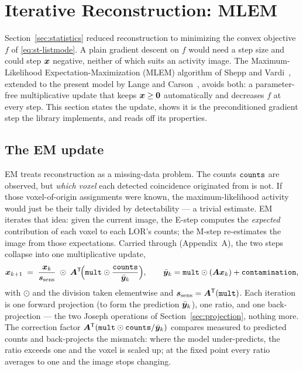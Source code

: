 \section{Iterative Reconstruction: MLEM}
\label{sec:mlem}

Section~\ref{sec:statistics} reduced reconstruction to minimizing the convex
objective $f$ of \eqref{eq:st-listmode}. A plain gradient descent on $f$ would
need a step size and could step $\bm{x}$ negative, neither of which suits an
activity image. The Maximum-Likelihood Expectation-Maximization (MLEM) algorithm
of Shepp and Vardi~\cite{shepp1982}, extended to the present model by Lange and
Carson~\cite{lange1984}, avoids both: a parameter-free multiplicative update that
keeps $\bm{x}\ge\bm0$ automatically and decreases $f$ at every step. This section
states the update, shows it is the preconditioned gradient step the library
implements, and reads off its properties.

\subsection{The EM update}
\label{sec:mlem:em}

EM treats reconstruction as a missing-data problem. The counts $\texttt{counts}$
are observed, but \emph{which voxel} each detected coincidence originated from is
not. If those voxel-of-origin assignments were known, the maximum-likelihood
activity would just be their tally divided by detectability --- a trivial
estimate. EM iterates that idea: given the current image, the E-step computes the
\emph{expected} contribution of each voxel to each LOR's counts; the M-step
re-estimates the image from those expectations. Carried through (Appendix~A), the
two steps collapse into one multiplicative update,
\begin{equation}
  \bm{x}_{k+1} \;=\; \frac{\bm{x}_k}{\bm{s}_{\mathrm{sens}}}\;\odot\;
                  \bm{A}^{\mathsf{T}}\!\Bigl(\texttt{mult}\odot\frac{\texttt{counts}}{\bar{\bm{y}}_k}\Bigr),
  \qquad
  \bar{\bm{y}}_k = \texttt{mult}\odot(\bm{A}\bm{x}_k) + \texttt{contamination},
  \label{eq:ml-em}
\end{equation}
with $\odot$ and the division taken elementwise and
$\bm{s}_{\mathrm{sens}}=\bm{A}^{\mathsf{T}}(\texttt{mult})$. Each iteration is one forward projection (to form
the prediction $\bar{\bm{y}}_k$), one ratio, and one back-projection --- the two Joseph
operations of Section~\ref{sec:projection}, nothing more. The correction factor
$\bm{A}^{\mathsf{T}}(\texttt{mult}\odot\texttt{counts}/\bar{\bm{y}}_k)$ compares measured to predicted
counts and back-projects the mismatch: where the model under-predicts, the ratio
exceeds one and the voxel is scaled up; at the fixed point every ratio averages
to one and the image stops changing.

